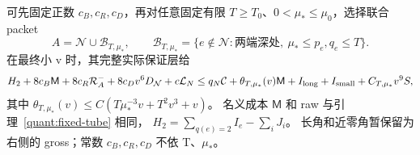 \begin{lemma}[保留名义成本的二轴价]\label{quant:uniform-complement}
可先固定正数 \(c_B,c_R,c_D\)，再对任意固定有限
\(T\ge T_0\)、\(0<\mu_*\le\mu_0\)，选择联合 packet
\[
 A=\mathcal N\cup\mathcal B_{T,\mu_*},\qquad
 \mathcal B_{T,\mu_*}
 =\{e\notin\mathcal N:\text{两端深处},\ \mu_*\le p_e,q_e\le T\}.
\]
在最终小 v 时，其完整实际保证层给
\begin{equation}\label{quant:uniform-price}
 \begin{aligned}
 H_2+8c_B\mathsf M+8c_R\mathcal R_A^-+8c_Dv^6D_{\mathcal N}
       +c\mathcal L_N
 \le q_N\mathcal C+\theta_{T,\mu_*}(v)\mathsf M
       +I_{\rm long}+I_{\rm small}+C_{T,\mu_*}v^9S,
 \end{aligned}
\end{equation}
其中
\(\theta_{T,\mu_*}(v)\le C(T\mu_*^{-3}v+T^2v^3+v)\)。
名义成本 \(\mathsf M\) 和 raw 与引理~\ref{quant:fixed-tube} 相同，
\(H_2=\sum_{q(e)=2}I_e-\sum_iJ_i\)。
长角和近零角暂保留为右侧的 gross；常数 \(c_B,c_R,c_D\) 不依 T、\(\mu_*\)。
\end{lemma}
